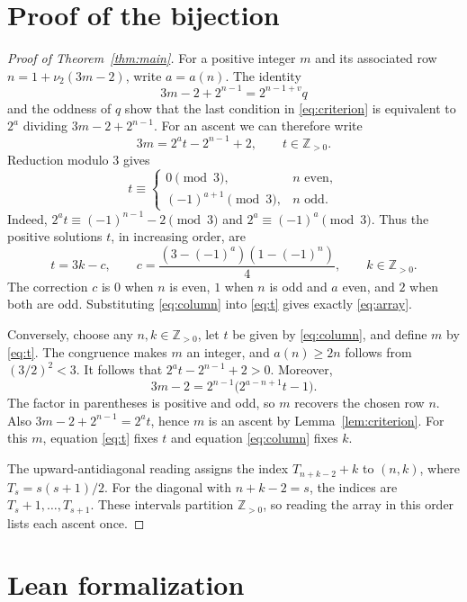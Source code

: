 \documentclass[11pt,a4paper]{amsart}
\newcommand{\Npos}{\mathbb{Z}_{>0}}
\begin{document}
\section{Proof of the bijection}

\begin{proof}[Proof of Theorem~\ref{thm:main}]
For a positive integer \(m\) and its associated row
\(n=1+\nu_2(3m-2)\), write \(a=a(n)\). The identity
\[
  3m-2+2^{n-1}=2^{n-1+v}q
\]
and the oddness of \(q\) show that the last condition in
\eqref{eq:criterion} is equivalent to \(2^a\) dividing
\(3m-2+2^{n-1}\). For an ascent we can therefore write
\begin{equation}\label{eq:t}
  3m=2^a t-2^{n-1}+2,\qquad t\in\Npos.
\end{equation}
Reduction modulo \(3\) gives
\[
 t\equiv
 \begin{cases}
  0\pmod{3}, & n\text{ even},\\
  (-1)^{a+1}\pmod{3}, & n\text{ odd}.
 \end{cases}
\]
Indeed, \(2^a t\equiv (-1)^{n-1}-2\pmod{3}\) and \(2^a\equiv
(-1)^a\pmod{3}\). Thus the positive solutions \(t\), in increasing
order, are
\begin{equation}\label{eq:column}
  t=3k-c,\qquad
  c=\frac{(3-(-1)^a)(1-(-1)^n)}{4},\qquad k\in\Npos.
\end{equation}
The correction \(c\) is \(0\) when \(n\) is even, \(1\) when \(n\) is odd
and \(a\) even, and \(2\) when both are odd. Substituting
\eqref{eq:column} into \eqref{eq:t} gives exactly \eqref{eq:array}.

Conversely, choose any \(n,k\in\Npos\), let \(t\) be given by
\eqref{eq:column}, and define \(m\) by \eqref{eq:t}. The congruence
makes \(m\) an integer, and \(a(n)\ge2n\) follows from \((3/2)^2<3\).
It follows that \(2^a t-2^{n-1}+2>0\). Moreover,
\[
  3m-2=2^{n-1}\bigl(2^{a-n+1}t-1\bigr).
\]
The factor in parentheses is positive and odd, so \(m\) recovers the
chosen row \(n\). Also \(3m-2+2^{n-1}=2^a t\), hence \(m\) is an ascent
by Lemma~\ref{lem:criterion}. For this \(m\), equation \eqref{eq:t}
fixes \(t\) and equation \eqref{eq:column} fixes \(k\).

The upward-antidiagonal reading assigns the index
\(T_{n+k-2}+k\) to \((n,k)\), where \(T_s=s(s+1)/2\).
For the diagonal with \(n+k-2=s\), the indices are
\(T_s+1,\ldots,T_{s+1}\). These intervals partition \(\Npos\),
so reading the array in this order lists each ascent once.
\end{proof}

\section{Lean formalization}\label{sec:lean}
\end{document}
